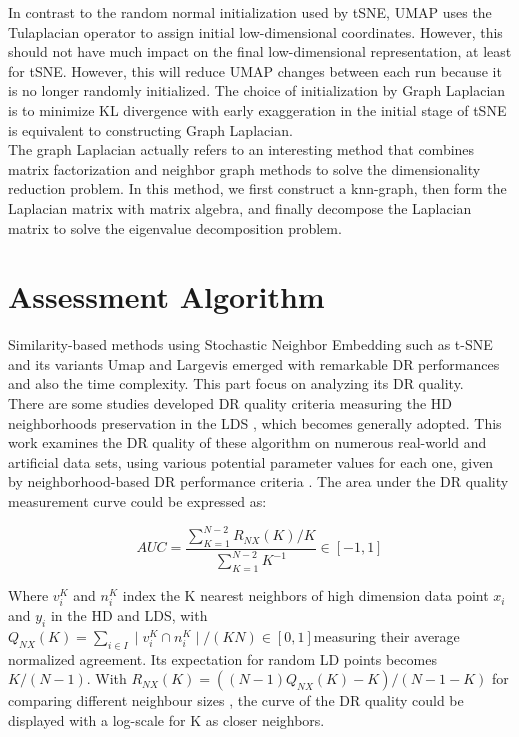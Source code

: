 \noindent In contrast to the random normal initialization used by tSNE, UMAP uses the Tulaplacian operator to assign initial low-dimensional coordinates. However, this should not have much impact on the final low-dimensional representation, at least for tSNE. However, this will reduce UMAP changes between each run because it is no longer randomly initialized. The choice of initialization by Graph Laplacian is to minimize KL divergence with early exaggeration in the initial stage of tSNE is equivalent to constructing Graph Laplacian.\\

\noindent The graph Laplacian actually refers to an interesting method that combines matrix factorization and neighbor graph methods to solve the dimensionality reduction problem. In this method, we first construct a knn-graph, then form the Laplacian matrix with matrix algebra, and finally decompose the Laplacian matrix to solve the eigenvalue decomposition problem.\\

\chapter{Assessment Algorithm}

Similarity-based methods using Stochastic Neighbor Embedding such as t-SNE and its variants Umap and Largevis emerged with remarkable DR performances and also the time complexity. This part focus on analyzing its DR quality. \\

\noindent There are some studies developed DR quality criteria measuring the HD neighborhoods preservation in the LDS \cite{ref10}, which becomes generally adopted. This work examines the DR quality of these algorithm on numerous real-world and artificial data sets\cite{ref8}, using various potential parameter values for each one, given by neighborhood-based DR performance criteria \cite{ref9}. The area under the DR quality measurement curve could be expressed as:

\begin{equation*}
    AUC  = \frac{ \sum_{K=1}^{N-2} R_{NX}(K)/K}{\sum_{K=1}^{N-2}K^{-1}}   \in [-1,1]
\end{equation*}

\noindent Where $v^K_i$ and $n^K_i$ index the K nearest neighbors of high dimension data point $x_i$ and $y_i$ in the HD and LDS, with $Q_{NX} (K) = \sum_{i \in I} \mid v^K_i \cap n^K_i \mid / (KN) \in [0, 1] $measuring their average normalized agreement\cite{ref8}. Its expectation for random LD points becomes $K/ (N − 1)$. With $R_{NX} (K) = ((N − 1)Q_{NX} (K) − K) /(N − 1 − K)$ for comparing different neighbour sizes \cite{ref11}, the curve of the DR quality could be displayed with a log-scale for K as closer neighbors. \\ 